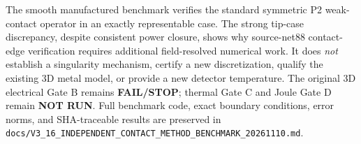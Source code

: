 
The smooth manufactured benchmark verifies the standard symmetric P2 weak-contact operator in an exactly representable case. The strong tip-case discrepancy, despite consistent power closure, shows why source-net88 contact-edge verification requires additional field-resolved numerical work. It does \emph{not} establish a singularity mechanism, certify a new discretization, qualify the existing 3D metal model, or provide a new detector temperature. The original 3D electrical Gate B remains \textbf{FAIL/STOP}; thermal Gate C and Joule Gate D remain \textbf{NOT RUN}. Full benchmark code, exact boundary conditions, error norms, and SHA-traceable results are preserved in \texttt{docs/V3\_16\_INDEPENDENT\_CONTACT\_METHOD\_BENCHMARK\_20261110.md}.
